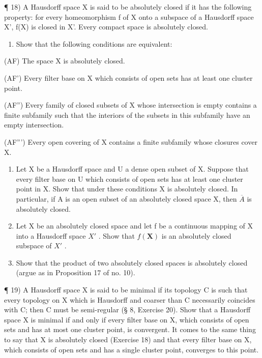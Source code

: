 ¶ 18) A Hausdorff space X is said to be absolutely closed if it has the following property: for every homeomorphism f of X onto a subspace of a Hausdorff space X', f(X) is closed in X'. Every compact space is absolutely closed.

\begin{enumerate}
\def\labelenumi{\alph{enumi})}
\tightlist
\item
  Show that the following conditions are equivalent:
\end{enumerate}

(AF) The space X is absolutely closed.

(AF') Every filter base on X which consists of open sets has at least one cluster point.

(AF'') Every family of closed subsets of X whose intersection is empty contains a finite subfamily such that the interiors of the subsets in this subfamily have an empty intersection.

(AF''') Every open covering of X contains a finite subfamily whose closures cover X.

\begin{enumerate}
\def\labelenumi{\alph{enumi})}
\setcounter{enumi}{1}
\item
  Let X be a Hausdorff space and U a dense open subset of X. Suppose that every filter base on U which consists of open sets has at least one cluster point in X. Show that under these conditions X is absolutely closed. In particular, if A is an open subset of an absolutely closed space X, then \(\overline{A}\) is absolutely closed.
\item
  Let X be an absolutely closed space and let f be a continuous mapping of X into a Hausdorff space \(X'\) . Show that \(f(\mathbf{X})\) is an absolutely closed subspace of \(X'\) .
\item
  Show that the product of two absolutely closed spaces is absolutely closed (argue as in Proposition 17 of no. 10).
\end{enumerate}

¶ 19) A Hausdorff space X is said to be minimal if its topology C is such that every topology on X which is Hausdorff and coarser than C necessarily coincides with C; then C must be semi-regular (§ 8, Exercise 20). Show that a Hausdorff space X is minimal if and only if every filter base on X, which consists of open sets and has at most one cluster point, is convergent. It comes to the same thing to say that X is absolutely closed (Exercise 18) and that every filter base on X, which consists of open sets and has a single cluster point, converges to this point.

